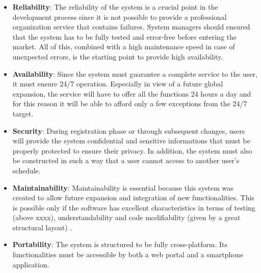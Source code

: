 \begin{itemize}
	\item \textbf{Reliability}: The reliability of the system is a crucial point in the development process since it is not possible to provide a professional organization service that contains failures. System managers should ensured that the system has to be fully tested and error-free before entering the market. All of this, combined with a high maintenance speed in case of unexpected errors, is the starting point to provide high availability.
	\item \textbf{Availability}: Since the system must guarantee a complete service to the user, it must ensure 24/7 operation. Especially in view of a future global expansion, the service will have to offer all the functions 24 hours a day and for this reason it will be able to afford only a few exceptions from the 24/7 target. 
	\item \textbf{Security}: During registration phase or through subsequent changes, users will provide the system confidential and sensitive informations that must be properly protected to ensure their privacy. In addition, the system must also be constructed in such a way that a user cannot access to another user's schedule.
	\item \textbf{Maintainability}: Maintainability is essential because this system was created to allow future expansion and integration of new functionalities. This is possible only if the software has excellent characteristics in terms of testing (above xxxx), understandability and code modifiability (given by a great structural layout) .
	\item \textbf{Portability}: The system is structured to be fully cross-platform. Its functionalities must be accessible by both a web portal and a smartphone application.
\end{itemize}